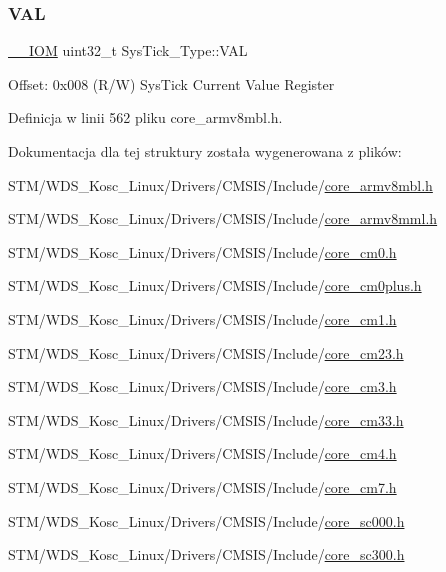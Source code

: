 \subsubsection{\texorpdfstring{V\+AL}{VAL}}
{\footnotesize\ttfamily \hyperlink{core__sc300_8h_ab6caba5853a60a17e8e04499b52bf691}{\+\_\+\+\_\+\+I\+OM} uint32\+\_\+t Sys\+Tick\+\_\+\+Type\+::\+V\+AL}

Offset\+: 0x008 (R/W) Sys\+Tick Current Value Register 

Definicja w linii 562 pliku core\+\_\+armv8mbl.\+h.



Dokumentacja dla tej struktury została wygenerowana z plików\+:\begin{DoxyCompactItemize}
\item 
S\+T\+M/\+W\+D\+S\+\_\+\+Kosc\+\_\+\+Linux/\+Drivers/\+C\+M\+S\+I\+S/\+Include/\hyperlink{core__armv8mbl_8h}{core\+\_\+armv8mbl.\+h}\item 
S\+T\+M/\+W\+D\+S\+\_\+\+Kosc\+\_\+\+Linux/\+Drivers/\+C\+M\+S\+I\+S/\+Include/\hyperlink{core__armv8mml_8h}{core\+\_\+armv8mml.\+h}\item 
S\+T\+M/\+W\+D\+S\+\_\+\+Kosc\+\_\+\+Linux/\+Drivers/\+C\+M\+S\+I\+S/\+Include/\hyperlink{core__cm0_8h}{core\+\_\+cm0.\+h}\item 
S\+T\+M/\+W\+D\+S\+\_\+\+Kosc\+\_\+\+Linux/\+Drivers/\+C\+M\+S\+I\+S/\+Include/\hyperlink{core__cm0plus_8h}{core\+\_\+cm0plus.\+h}\item 
S\+T\+M/\+W\+D\+S\+\_\+\+Kosc\+\_\+\+Linux/\+Drivers/\+C\+M\+S\+I\+S/\+Include/\hyperlink{core__cm1_8h}{core\+\_\+cm1.\+h}\item 
S\+T\+M/\+W\+D\+S\+\_\+\+Kosc\+\_\+\+Linux/\+Drivers/\+C\+M\+S\+I\+S/\+Include/\hyperlink{core__cm23_8h}{core\+\_\+cm23.\+h}\item 
S\+T\+M/\+W\+D\+S\+\_\+\+Kosc\+\_\+\+Linux/\+Drivers/\+C\+M\+S\+I\+S/\+Include/\hyperlink{core__cm3_8h}{core\+\_\+cm3.\+h}\item 
S\+T\+M/\+W\+D\+S\+\_\+\+Kosc\+\_\+\+Linux/\+Drivers/\+C\+M\+S\+I\+S/\+Include/\hyperlink{core__cm33_8h}{core\+\_\+cm33.\+h}\item 
S\+T\+M/\+W\+D\+S\+\_\+\+Kosc\+\_\+\+Linux/\+Drivers/\+C\+M\+S\+I\+S/\+Include/\hyperlink{core__cm4_8h}{core\+\_\+cm4.\+h}\item 
S\+T\+M/\+W\+D\+S\+\_\+\+Kosc\+\_\+\+Linux/\+Drivers/\+C\+M\+S\+I\+S/\+Include/\hyperlink{core__cm7_8h}{core\+\_\+cm7.\+h}\item 
S\+T\+M/\+W\+D\+S\+\_\+\+Kosc\+\_\+\+Linux/\+Drivers/\+C\+M\+S\+I\+S/\+Include/\hyperlink{core__sc000_8h}{core\+\_\+sc000.\+h}\item 
S\+T\+M/\+W\+D\+S\+\_\+\+Kosc\+\_\+\+Linux/\+Drivers/\+C\+M\+S\+I\+S/\+Include/\hyperlink{core__sc300_8h}{core\+\_\+sc300.\+h}\end{DoxyCompactItemize}
